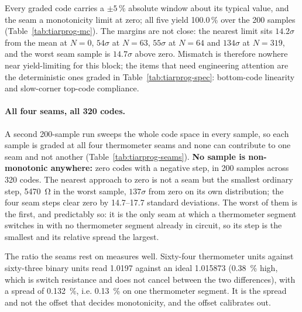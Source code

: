 Every graded code carries a \(\pm 5\,\%\) absolute window about its typical
value, and the seam a monotonicity limit at zero; all five yield 100.0\,\% over
the 200 samples (Table~\ref{tab:tiarprog-mc}). The margins are not close: the
nearest limit sits \(14.2\sigma\) from the mean at \(N{=}0\), \(54\sigma\) at
\(N{=}63\), \(55\sigma\) at \(N{=}64\) and \(134\sigma\) at \(N{=}319\), and
the worst seam sample is \(14.7\sigma\) above zero. Mismatch is therefore
nowhere near yield-limiting for this block; the items that need engineering
attention are the deterministic ones graded in
Table~\ref{tab:tiarprog-spec}: bottom-code linearity and slow-corner
top-code compliance.

\paragraph{All four seams, all 320 codes.} A second 200-sample run sweeps the
whole code space in every sample, so each sample is graded at all four
thermometer seams and none can contribute to one seam and not another
(Table~\ref{tab:tiarprog-seams}). \textbf{No sample is non-monotonic anywhere:}
zero codes with a negative step, in 200 samples across 320 codes. The nearest
approach to zero is not a seam but the smallest ordinary step,
\SI{5470}{\ohm} in the worst sample, \(137\sigma\) from zero on its own
distribution; the four seam steps clear zero by \numrange{14.7}{17.7} standard
deviations. The worst of them is the first, and predictably so: it is the only
seam at which a thermometer segment switches in with no thermometer segment
already in circuit, so its step is the smallest and its relative spread the
largest.

The ratio the seams rest on measures well. Sixty-four thermometer units against
sixty-three binary units read \num{1.0197} against an ideal \num{1.015873}
(\SI{0.38}{\percent} high, which is switch resistance and does not cancel between
the two differences), with a spread of \SI{0.132}{\percent}, i.e.
\SI{0.13}{\percent} on one thermometer segment. It is the spread and not the
offset that decides monotonicity, and the offset calibrates out.

